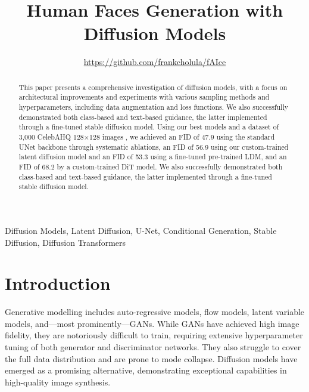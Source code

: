 \documentclass[conference]{IEEEtran}
\begin{document}
\title{Human Faces Generation with Diffusion Models\\

}

\author{
    \href{https://github.com/frankcholula/faice}{https://github.com/frankcholula/fAIce}
}


\maketitle

\begin{abstract}\label{abstract}
This paper presents a comprehensive investigation of diffusion models, with a focus on architectural improvements and experiments with various sampling methods and hyperparameters, including data augmentation and loss functions. We also successfully demonstrated both class-based and text-based guidance, the latter implemented through a fine-tuned stable diffusion model. Using our best models and a dataset of 3,000 CelebAHQ 128×128 images \cite{karrasProgressiveGrowingGANs2018a}, we achieved an FID of 47.9 using the standard UNet backbone through systematic ablations, an FID of 56.9 using our custom-trained latent diffusion model and an FID of 53.3 using a fine-tuned pre-trained LDM, and an FID of 68.2 by a custom-trained DiT model.
We also successfully demonstrated both class-based and text-based guidance, the latter implemented through a fine-tuned stable diffusion model.

\end{abstract}

\begin{IEEEkeywords}\label{keywords}
Diffusion Models, Latent Diffusion, U-Net, Conditional Generation, Stable Diffusion, Diffusion Transformers
\end{IEEEkeywords}

\section{Introduction} \label{introduction}
Generative modelling includes auto-regressive models, flow models, latent variable models, and—most prominently—GANs\cite{goodfellowGenerativeAdversarialNetworks2014}. While GANs have achieved high image fidelity, they are notoriously difficult to train, requiring extensive hyperparameter tuning of both generator and discriminator networks. They also struggle to cover the full data distribution and are prone to mode collapse. Diffusion models have emerged as a promising alternative, demonstrating exceptional capabilities in high-quality image synthesis. 
\end{document}
